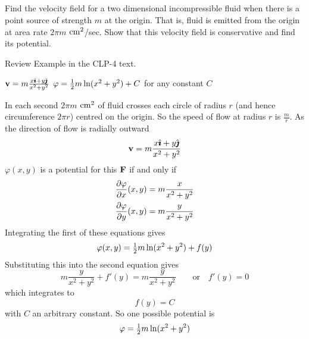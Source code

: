 \subsection*{\Application}

\begin{question}
Find the velocity field for a two dimensional incompressible
fluid when there is a point source of strength $m$ at the origin. That is, fluid
is emitted from the origin at area rate $2\pi m$ ${\rm cm}^2$/sec.
Show that this velocity field is conservative and find its potential.
\end{question}

\begin{hint}
Review Example  in the CLP-4 text.
\end{hint}

\begin{answer}
$\mathbf{v}=m\frac{x\hat{\pmb{\imath}}+y\hat{\pmb{\jmath}}}{x^2+y^2}$\qquad
$\varphi=\tfrac{1}{2} m\ln(x^2+y^2)+C$ for any constant $C$
\end{answer}

\begin{solution}
 In each second $2\pi m$ ${\rm cm}^2$ of fluid crosses each
circle of radius $r$ (and hence circumference $2\pi r$) centred on the
origin. So the speed of flow at radius $r$ is $\frac{m}{r}$. As the direction
of flow is radially outward
\begin{align*}
   \mathbf{v}=m\frac{x\hat{\pmb{\imath}}+y\hat{\pmb{\jmath}}}{x^2+y^2}
\end{align*}
$\varphi(x,y)$ is a potential for this $\mathbf{F}$ if and only if
\begin{align*}
\pdiff{\varphi}{x}(x,y) &= m\frac{x}{x^2+y^2} \\
\pdiff{\varphi}{y}(x,y) &= m\frac{y}{x^2+y^2} 
\end{align*}
Integrating the first of these equations gives
\begin{equation*}
\varphi(x,y) = \tfrac{1}{2} m\ln(x^2+y^2) + f(y)
\end{equation*}
Substituting this into the second equation gives 
\begin{equation*}
m\frac{y}{x^2+y^2} + f'(y) 
   = m\frac{y}{x^2+y^2}\qquad\text{or}\quad
f'(y) = 0
\end{equation*}
which integrates to
\begin{equation*}
f(y) = C
\end{equation*}
with $C$ an arbitrary constant. So one possible potential is
\begin{equation*}
\varphi=\tfrac{1}{2} m\ln(x^2+y^2)
\end{equation*}

\end{solution}


